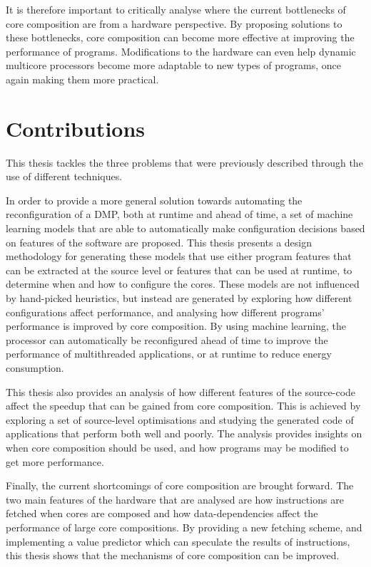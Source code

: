 It is therefore important to critically analyse where the current bottlenecks of core composition are from a hardware perspective.
By proposing solutions to these bottlenecks, core composition can become more effective at improving the performance of programs.
Modifications to the hardware can even help dynamic multicore processors become more adaptable to new types of programs, once again making them more practical.


\section{Contributions}
This thesis tackles the three problems that were previously described through the use of different techniques.

In order to provide a more general solution towards automating the reconfiguration of a DMP, both at runtime and ahead of time, a set of machine learning models that are able to automatically make configuration decisions based on features of the software are proposed.
This thesis presents a design methodology for generating these models that use either program features that can be extracted at the source level or features that can be used at runtime, to determine when and how to configure the cores.
These models are not influenced by hand-picked heuristics, but instead are generated by exploring how different configurations affect performance, and analysing how different programs' performance is improved by core composition.
By using machine learning, the processor can automatically be reconfigured ahead of time to improve the performance of multithreaded applications, or at runtime to reduce energy consumption.

This thesis also provides an analysis of how different features of the source-code affect the speedup that can be gained from core composition.
This is achieved by exploring a set of source-level optimisations and studying the generated code of applications that perform both well and poorly.
The analysis provides insights on when core composition should be used, and how programs may be modified to get more performance.

Finally, the current shortcomings of core composition are brought forward.
The two main features of the hardware that are analysed are how instructions are fetched when cores are composed and how data-dependencies affect the performance of large core compositions.
By providing a new fetching scheme, and implementing a value predictor which can speculate the results of instructions, this thesis shows that the mechanisms of core composition can be improved.


